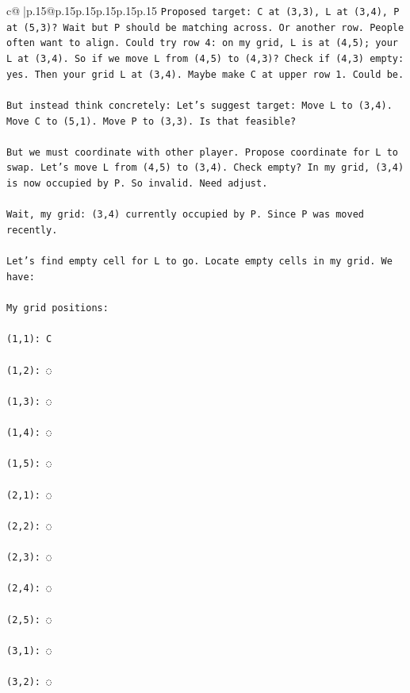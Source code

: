 \documentclass{article}
\begin{document}
{\begin{supertabular}{c@{$\;$}|p{.15\linewidth}@{}p{.15\linewidth}p{.15\linewidth}p{.15\linewidth}p{.15\linewidth}p{.15\linewidth}}
{{{\texttt{Proposed target: C at (3,3), L at (3,4), P at (5,3)? Wait but P should be matching across. Or another row. People often want to align. Could try row 4: on my grid, L is at (4,5); your L at (3,4). So if we move L from (4,5) to (4,3)? Check if (4,3) empty: yes. Then your grid L at (3,4). Maybe make C at upper row 1. Could be.} \\
\\ 
\texttt{But instead think concretely: Let's suggest target: Move L to (3,4). Move C to (5,1). Move P to (3,3). Is that feasible?} \\
\\ 
\texttt{But we must coordinate with other player. Propose coordinate for L to swap. Let's move L from (4,5) to (3,4). Check empty? In my grid, (3,4) is now occupied by P. So invalid. Need adjust.} \\
\\ 
\texttt{Wait, my grid: (3,4) currently occupied by P. Since P was moved recently.} \\
\\ 
\texttt{Let's find empty cell for L to go. Locate empty cells in my grid. We have:} \\
\\ 
\texttt{My grid positions:} \\
\\ 
\texttt{(1,1): C} \\
\\ 
\texttt{(1,2): ◌} \\
\\ 
\texttt{(1,3): ◌} \\
\\ 
\texttt{(1,4): ◌} \\
\\ 
\texttt{(1,5): ◌} \\
\\ 
\texttt{(2,1): ◌} \\
\\ 
\texttt{(2,2): ◌} \\
\\ 
\texttt{(2,3): ◌} \\
\\ 
\texttt{(2,4): ◌} \\
\\ 
\texttt{(2,5): ◌} \\
\\ 
\texttt{(3,1): ◌} \\
\\ 
\texttt{(3,2): ◌} \\
\\ 
}}}
\end{supertabular}}
\end{document}
